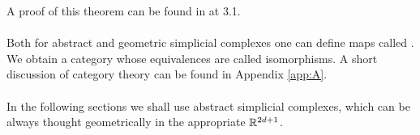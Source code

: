 \documentclass[../1.tex]{subfiles}
\begin{document}
    A proof of this theorem can be found in \cite{comptop} at 3.1.\\
    \hfill \\
    Both for abstract and geometric simplicial complexes one can define maps called . We obtain a category whose
    equivalences are called isomorphisms. 
    A short discussion of category theory can be found in Appendix \autoref{app:A}.\\
    \hfill \\
    In the following sections we shall use abstract simplicial complexes, which can be always thought geometrically in the appropriate $\mathbb{R}^{2d+1}$.






\end{document}
